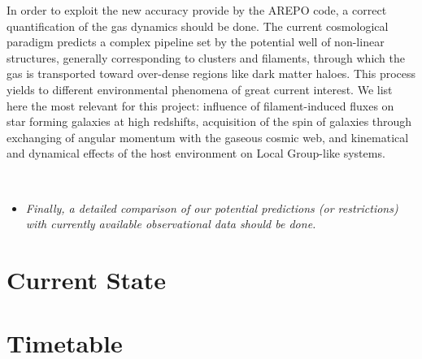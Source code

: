 \documentclass[a4,useAMS,usenatbib,usegraphicx,12pt]{article}
\begin{document}
In order to exploit the new accuracy provide by the AREPO code, a correct 
quantification of the gas dynamics should be done. The current cosmological 
paradigm predicts a complex pipeline set by the potential well of non-linear 
structures, generally corresponding to clusters and filaments, through which 
the gas is transported toward over-dense regions like dark matter haloes. This
process yields to different environmental phenomena of great current interest.
We list here the most relevant for this project: influence of filament-induced 
fluxes on star forming galaxies at high redshifts, acquisition of the spin of 
galaxies through exchanging of angular momentum with the gaseous cosmic web, 
and kinematical and dynamical effects of the host environment on Local 
Group-like systems.

\

\begin{itemize}

\item[\checkmark] \textit{Finally, a detailed comparison of our potential 
predictions (or restrictions) with currently available observational data
should be done.}

\end{itemize}



\section{Current State}


\section{Timetable}



\renewcommand{\bibname}{8\ \ \ \ Bibliography}

\end{document}
